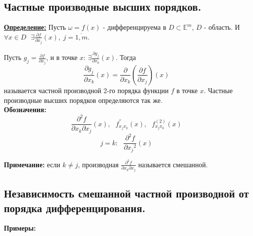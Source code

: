 \documentclass[a4paper,12pt]{article} %
\begin{document}
\subsection{Частные производные высших порядков.}

\underline{\textbf{Определение:}} Пусть $\omega = f(x)$ - дифференцируема в $D \subset \mathbb{E}^m$, $D$ - область.
И $\forall x \in D \text{ }\exists \frac{\partial{f}}{\partial{x_j}}(x), \; j = \overline{1, m}$.

Пусть $g_j = \frac{\partial{f}}{\partial{x_j}}$, и в точке $x$:  $\exists\frac{\partial{g_j}}{\partial{x_k}}(x)$. Тогда
\[
	\frac{\partial{g_j}}{\partial{x_k}}(x) = \frac{\partial{ }}{\partial{x_k}}\left(\frac{\partial{f}}{\partial{x_j}}\right)(x)
\]
называется частной производной 2-го порядка функции $f$ в точке $x$. Частные производные высших порядков определяются так же.\\

\textbf{Обозначения:} 
\[		
	\frac{\partial^2f}{\partial{x_k}\partial{x_j}}(x), \text{   } f^{''}_{x_jx_k}(x), \text{   } f^{(2)}_{x_jx_k}(x)
\]
\[
	j = k: \text{ }\frac{\partial^2f}{\partial{x_j}^2}(x)
\]

\textbf{Примечание:} если $k\neq j$, производная $\frac{\partial^2f}{\partial x_k\partial x_j}$ называется смешанной.

\subsection{Независимость смешанной частной производной от порядка дифференцирования.}

\textbf{Примеры:}
\end{document}
